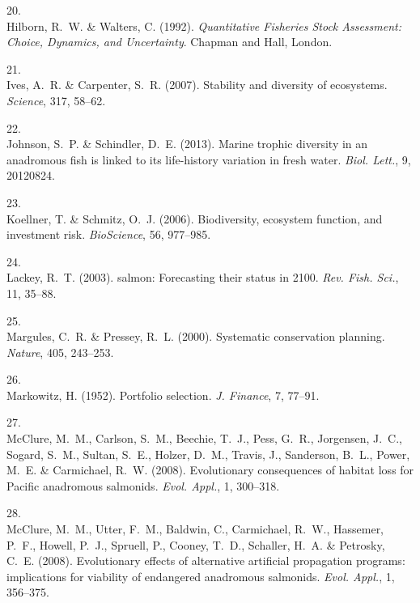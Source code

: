 \documentclass[11pt]{article}
\begin{document}
\begin{spacing}{1.6}
\begin{thebibliography}{50}
20.\\
Hilborn, R.~W. \& Walters, C. (1992).
\newblock \emph{Quantitative Fisheries Stock Assessment: Choice, Dynamics, and
  Uncertainty}.
\newblock Chapman and Hall, London.

21.\\
Ives, A.~R. \& Carpenter, S.~R. (2007).
\newblock Stability and diversity of ecosystems.
\newblock \emph{Science}, 317, 58--62.

22.\\
Johnson, S.~P. \& Schindler, D.~E. (2013).
\newblock Marine trophic diversity in an anadromous fish is linked to its
  life-history variation in fresh water.
\newblock \emph{Biol. Lett.}, 9, 20120824.

23.\\
Koellner, T. \& Schmitz, O.~J. (2006).
\newblock Biodiversity, ecosystem function, and investment risk.
\newblock \emph{BioScience}, 56, 977--985.

24.\\
Lackey, R.~T. (2003).
 salmon: Forecasting their status in 2100.
\newblock \emph{Rev. Fish. Sci.}, 11, 35--88.

25.\\
Margules, C.~R. \& Pressey, R.~L. (2000).
\newblock Systematic conservation planning.
\newblock \emph{Nature}, 405, 243--253.

26.\\
Markowitz, H. (1952).
\newblock Portfolio selection.
\newblock \emph{J. Finance}, 7, 77--91.

27.\\
McClure, M.~M., Carlson, S.~M., Beechie, T.~J., Pess, G.~R., Jorgensen, J.~C.,
  Sogard, S.~M., Sultan, S.~E., Holzer, D.~M., Travis, J., Sanderson, B.~L.,
  Power, M.~E. \& Carmichael, R.~W. (2008{}).
\newblock Evolutionary consequences of habitat loss for {Pacific} anadromous
  salmonids.
\newblock \emph{Evol. Appl.}, 1, 300--318.

28.\\
McClure, M.~M., Utter, F.~M., Baldwin, C., Carmichael, R.~W., Hassemer, P.~F.,
  Howell, P.~J., Spruell, P., Cooney, T.~D., Schaller, H.~A. \& Petrosky, C.~E.
  (2008{}).
\newblock Evolutionary effects of alternative artificial propagation programs:
  implications for viability of endangered anadromous salmonids.
\newblock \emph{Evol. Appl.}, 1, 356--375.


\end{thebibliography}
\end{spacing}
\end{document}
